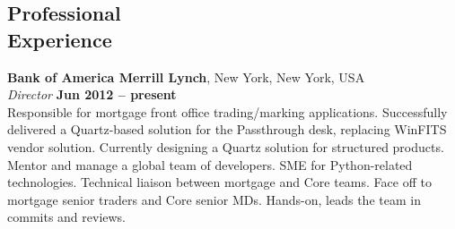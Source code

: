 \documentclass[margin,line]{resume}
\begin{document}
\begin{resume}



    \section{\mysidestyle Professional\\Experience}

    \textbf{Bank of America Merrill Lynch}, New York, New York, USA \vspace{2mm}\\\vspace{1mm}%
    \textsl{Director} \hfill \textbf{Jun 2012 -- present}\\
    Responsible for mortgage front office trading/marking applications. Successfully delivered a Quartz-based solution for
    the Passthrough desk, replacing WinFITS vendor solution. Currently designing a Quartz solution for structured products.
    Mentor and manage a global team of developers. SME for Python-related technologies. Technical liaison between mortgage
    and Core teams. Face off to mortgage senior traders and Core senior MDs. Hands-on, leads the team in commits and reviews.


\end{resume}
\end{document}
